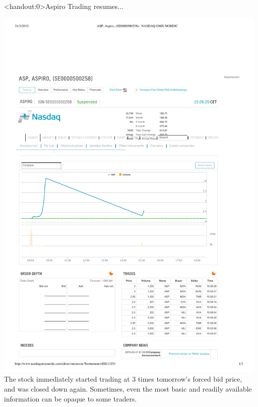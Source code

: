 \documentclass[english,10pt
,aspectratio=169
]{beamer}
\begin{document}
\begin{frame}<handout:0>{Aspiro}
	Trading resumes...
	
	\includegraphics[width=0.85 \paperwidth]{pics/aspiro3}
	\pause
	The stock immediately started trading at 3 times tomorrow's forced bid price, and was closed down again.
	\pause 
	Sometimes, even the most basic and readily available information can be opaque to some traders.
	\hyperlink{ideas}{}
\end{frame}


\end{document}
